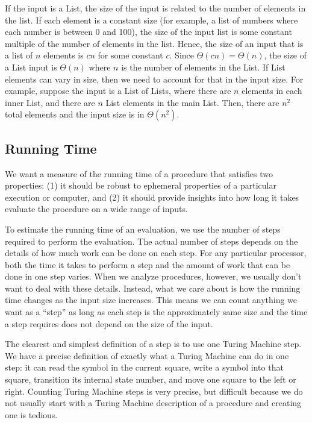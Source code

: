\begin{schemeregion}
 If the input is a List, the size of the input is related to the number of elements in the list.  If each element is a constant size (for example, a list of numbers where each number is between 0 and 100), the size of the input list is some constant multiple of the number of elements in the list.  Hence, the size of an input that is a list of $n$ elements is $cn$ for some constant $c$.  Since $\Theta(cn) = \Theta(n)$, the size of a List input is $\Theta(n)$ where $n$ is the number of elements in the List.  If List elements can vary in size, then we need to account for that in the input size.  For example, suppose the input is a List of Lists, where there are $n$ elements in each inner List, and there are $n$ List elements in the main List.  Then, there are $n^2$ total elements and the input size is in $\Theta(n^2)$.

\subsection{Running Time}

We want a measure of the running time of a procedure that satisfies two properties: (1) it should be robust to ephemeral properties of a particular execution or computer, and (2) it should provide insights into how long it takes evaluate the procedure on a wide range of inputs.  

To estimate the running time of an evaluation, we use the number of steps required to perform the evaluation.  The actual number of steps depends on the details of how much work can be done on each step.  For any particular processor, both the time it takes to perform a step and the amount of work that can be done in one step varies.  When we analyze procedures, however, we usually don't want to deal with these details.  Instead, what we care about is how the running time changes as the input size increases.  This means we can count anything we want as a ``step'' as long as each step is the approximately same size and the time a step requires does not depend on the size of the input.  

The clearest and simplest definition of a step is to use one Turing Machine step.  We have a precise definition of exactly what a Turing Machine can do in one step: it can read the symbol in the current square, write a symbol into that square, transition its internal state number, and move one square to the left or right.  Counting Turing Machine steps is very precise, but difficult because we do not usually start with a Turing Machine description of a procedure and creating one is tedious.  
 


\end{schemeregion}
